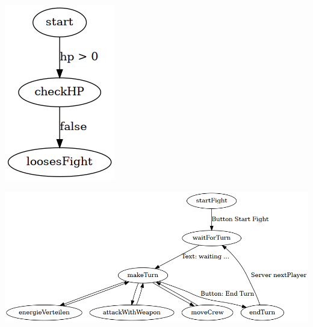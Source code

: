 \documentclass[11pt]{article}
\begin{document}
\begin{center}
\includegraphics[width=.9\linewidth]{fightMechanik.png}
\end{center}



\begin{center}
\includegraphics[width=.9\linewidth]{kampfRunde.png}
\end{center}
\end{document}
